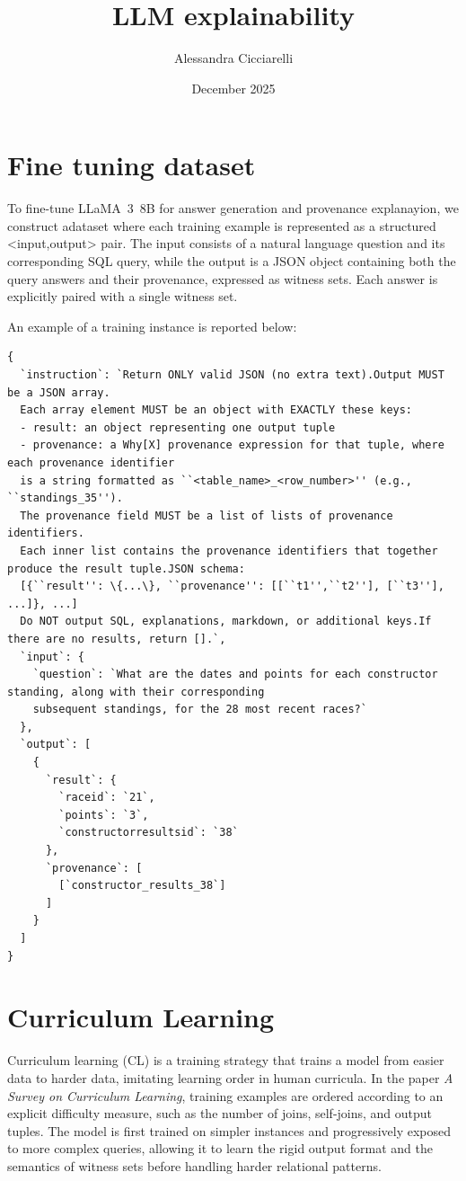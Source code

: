 \documentclass{article}
\title{LLM explainability}
\author{Alessandra Cicciarelli}
\date{December 2025}
\begin{document}
\maketitle
\section{Fine tuning dataset}
    

To fine-tune LLaMA~3~8B for answer generation and provenance explanayion, we construct adataset where each training example is represented as a structured <input,output> pair.
The input consists of a natural language question and its corresponding SQL query, while the output is a JSON object containing both the query answers and their provenance, expressed as witness sets.
Each answer is explicitly paired with a single witness set.

An example of a training instance is reported below:
\begin{Verbatim}
{
  `instruction`: `Return ONLY valid JSON (no extra text).Output MUST be a JSON array. 
  Each array element MUST be an object with EXACTLY these keys:
  - result: an object representing one output tuple
  - provenance: a Why[X] provenance expression for that tuple, where each provenance identifier 
  is a string formatted as ``<table_name>_<row_number>'' (e.g., ``standings_35'').
  The provenance field MUST be a list of lists of provenance identifiers.
  Each inner list contains the provenance identifiers that together produce the result tuple.JSON schema:
  [{``result'': \{...\}, ``provenance'': [[``t1'',``t2''], [``t3''], ...]}, ...]
  Do NOT output SQL, explanations, markdown, or additional keys.If there are no results, return [].`,
  `input`: {
    `question`: `What are the dates and points for each constructor standing, along with their corresponding 
    subsequent standings, for the 28 most recent races?`
  },
  `output`: [
    {
      `result`: {
        `raceid`: `21`,
        `points`: `3`,
        `constructorresultsid`: `38`
      },
      `provenance`: [
        [`constructor_results_38`]
      ]
    }
  ]
}

\end{Verbatim}

\section{Curriculum Learning}
Curriculum learning (CL) is a training strategy that trains a model from easier data to harder data, imitating learning order in human curricula.
In the paper \emph{A Survey on Curriculum Learning}\cite{curriculumsurvey}, training examples are ordered according to an explicit difficulty measure, such as the number of joins, self-joins, and output tuples.
The model is first trained on simpler instances and progressively exposed to more complex queries, allowing it to learn the rigid output format and the semantics of witness sets before handling harder relational patterns.
\end{document}
